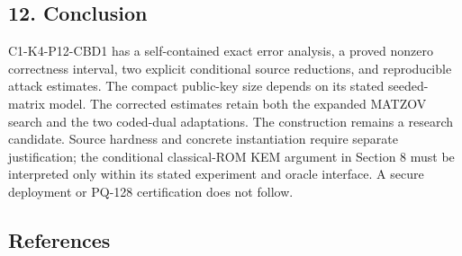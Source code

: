 \documentclass[
  10pt,
  a4paper,
]{article}
\begin{document}
\subsection{12. Conclusion}\label{conclusion}

C1-K4-P12-CBD1 has a self-contained exact error analysis, a proved
nonzero correctness interval, two explicit conditional source
reductions, and reproducible attack estimates. The compact public-key
size depends on its stated seeded-matrix model. The corrected estimates
retain both the expanded MATZOV search and the two coded-dual
adaptations. The construction remains a research candidate. Source
hardness and concrete instantiation require separate justification; the
conditional classical-ROM KEM argument in Section 8 must be interpreted
only within its stated experiment and oracle interface. A secure
deployment or PQ-128 certification does not follow.

\subsection{References}\label{references}
\end{document}

